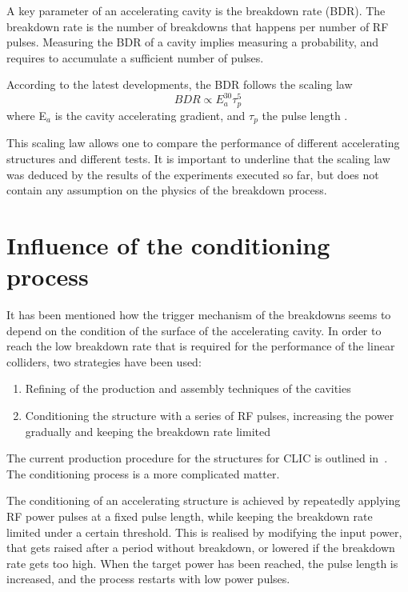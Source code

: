  A key parameter of an accelerating cavity is the breakdown rate (BDR). The breakdown rate is the number of breakdowns that happens per number of RF pulses. Measuring the BDR of a cavity implies measuring a probability, and requires to accumulate a sufficient number of pulses. 

According to the latest developments, the BDR follows the scaling law
\begin{equation}
BDR \propto E^{30}_a \tau^5_p 
\label{E30}
\end{equation}
where E$_a$ is the cavity accelerating gradient, and $\tau_p$ the pulse length  \cite{Wuensch:advaces}.

This scaling law allows one to compare the performance of different accelerating structures and different tests. It is important to underline that the scaling law was deduced by the results of the experiments executed so far, but does not contain any assumption on the physics of the breakdown process.




\section[Influence of the conditioning process]{Influence of the conditioning process}
\label{sec:conditioning}

It has been mentioned how the trigger mechanism of the breakdowns seems to depend on the condition of the surface of the accelerating cavity. In order to reach the low breakdown rate that is required for the performance of the linear colliders, two strategies have been used:
\begin{enumerate}
\item Refining of the production and assembly techniques of the cavities
\item Conditioning the structure with a series of RF pulses, increasing the power gradually and keeping the breakdown rate limited
\end{enumerate}
The current production procedure for the structures for CLIC is outlined in~\cite{CLIC:cdr}. The conditioning process is a more complicated matter. 

The conditioning of an accelerating structure is achieved by repeatedly applying RF power pulses at a fixed pulse length, while keeping the breakdown rate limited under a certain threshold. This is realised by modifying the input power, that gets raised after a period without breakdown, or lowered if the breakdown rate gets too high. When the target power has been reached, the pulse length is increased, and the process restarts with low power pulses.

